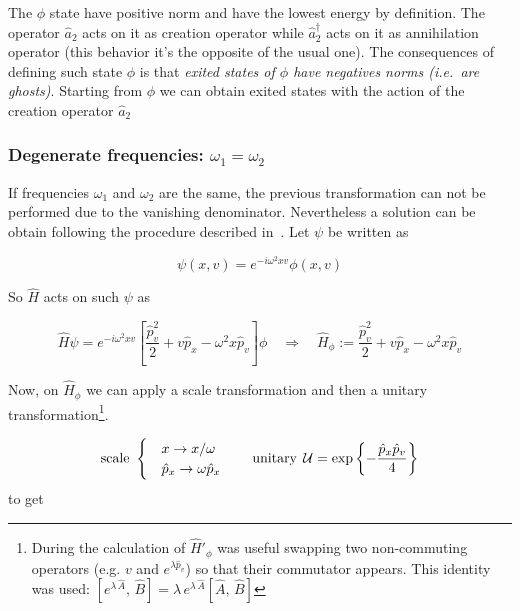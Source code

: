 The $\phi$ state have positive norm and have the lowest energy by definition.
The operator $\hat{a}_2$ acts on it as creation operator while
$\hat{a}_2^{\dagger}$ acts on it as annihilation operator (this behavior it's
the opposite of the usual one). The consequences of defining such state $\phi$
is that \emph{exited states of $\phi$ have negatives norms (i.e.\ are ghosts)}.
Starting from $\phi$ we can obtain exited states with the action of the creation
operator $\hat{a}_2$


\subsubsection{Degenerate frequencies: $\omega_1 = \omega_2$}
If frequencies $\omega_1$ and $\omega_2$ are the same, the previous
transformation can not be performed due to the vanishing denominator.
Nevertheless a solution can be obtain following the procedure described
in~\cite{PU50, Bolonek06}. Let $\psi$ be written as

\begin{equation*}
  \psi(x, v) = e^{-i\omega^2xv}\phi(x,v)
\end{equation*}

So $\hat{H}$ acts on such $\psi$ as

\begin{equation*}
  \hat{H} \psi = e^{-i\omega^2xv}
  \left[\frac{\hat{p}_v^2}{2} + v\hat{p}_x - \omega^2x\hat{p}_v \right] \phi
  \quad \Rightarrow \quad
  \hat{H}_{\phi} :=
  \frac{\hat{p}_v^2}{2} + v\hat{p}_x - \omega^2x\hat{p}_v
\end{equation*}

Now, on $\hat{H}_{\phi}$ we can apply a scale transformation and then a unitary
transformation\footnote{
  During the calculation of $\hat{H}'_{\phi}$ was useful swapping
  two non-commuting operators (e.g. $v$ and $e^{\lambda \hat{p}_v}$)
  so that their commutator appears. This identity was used:
  $\left[e^{\lambda \, \hat{A}}, \, \hat{B}\right] =
  \lambda \, e^{\lambda \, \hat{A}} \left[\hat{A} , \, \hat{B} \right]$
}.

\begin{equation*}
  \text{scale} \
  \begin{cases}
    &x         \rightarrow x/\omega \\
    &\hat{p}_x \rightarrow \omega\hat{p}_x
  \end{cases}
  \qquad \text{unitary} \;
  \operatorname{\mathcal{U}} = \exp\left\{ - \frac{\hat{p}_x \hat{p}_v}{4}\right\}
\end{equation*}
to get

